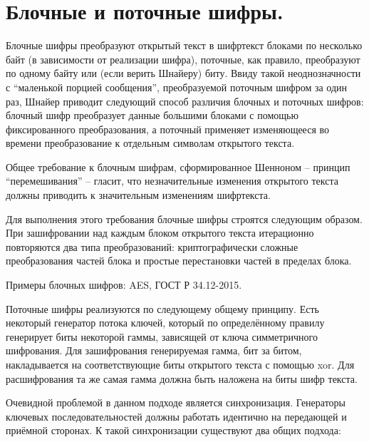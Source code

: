 \section{Блочные и поточные шифры.}

Блочные шифры преобразуют открытый текст в шифртекст блоками по несколько байт (в зависимости от реализации шифра), поточные, как правило, преобразуют по одному байту или (если верить Шнайеру) биту. Ввиду такой неоднозначности с “маленькой порцией сообщения”, преобразуемой поточным шифром за один раз, Шнайер приводит следующий способ различия блочных и поточных шифров: блочный шифр преобразует данные большими блоками с помощью фиксированного преобразования, а поточный применяет изменяющееся во времени преобразование к отдельным символам открытого текста. 

Общее требование к блочным шифрам, сформированное Шенноном -- принцип “перемешивания” -- гласит, что незначительные изменения открытого текста должны приводить к значительным изменениям шифртекста.

Для выполнения этого требования блочные шифры строятся следующим образом. При зашифровании над каждым блоком открытого текста итерационно повторяются два типа преобразований: криптографически сложные преобразования частей блока и простые перестановки частей в пределах блока.

Примеры блочных шифров: AES, ГОСТ Р 34.12-2015.

Поточные шифры реализуются по следующему общему принципу. Есть некоторый генератор потока ключей, который по определённому правилу генерирует биты некоторой гаммы, зависящей от ключа симметричного шифрования. Для зашифрования генерируемая гамма, бит за битом, накладывается на соответствующие биты открытого текста с помощью xor. Для расшифрования та же самая гамма должна быть наложена на биты шифр текста. 

Очевидной проблемой в данном подходе является синхронизация. Генераторы ключевых последовательностей должны работать идентично на передающей и приёмной сторонах. К такой синхронизации существуют два общих подхода:

